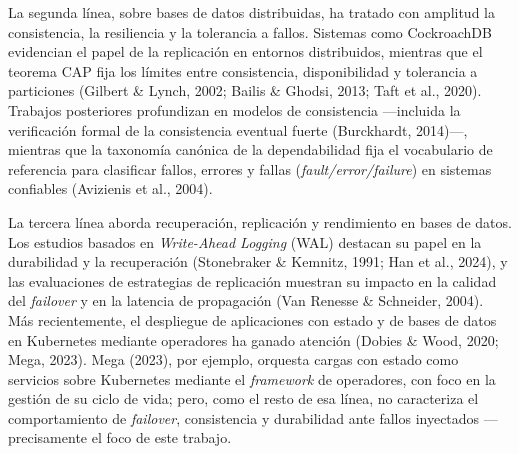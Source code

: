 \documentclass[12pt,twocolumn,letterpaper]{article}
\begin{document}
La segunda línea, sobre bases de datos distribuidas, ha tratado con amplitud la consistencia, la resiliencia y la tolerancia a fallos. Sistemas como CockroachDB evidencian el papel de la replicación en entornos distribuidos, mientras que el teorema CAP fija los límites entre consistencia, disponibilidad y tolerancia a particiones (Gilbert \& Lynch, 2002; Bailis \& Ghodsi, 2013; Taft et al., 2020). Trabajos posteriores profundizan en modelos de consistencia —incluida la verificación formal de la consistencia eventual fuerte (Burckhardt, 2014)—, mientras que la taxonomía canónica de la dependabilidad fija el vocabulario de referencia para clasificar fallos, errores y fallas (\textit{fault/error/failure}) en sistemas confiables (Avizienis et al., 2004).

La tercera línea aborda recuperación, replicación y rendimiento en bases de datos. Los estudios basados en \textit{Write-Ahead Logging} (WAL) destacan su papel en la durabilidad y la recuperación (Stonebraker \& Kemnitz, 1991; Han et al., 2024), y las evaluaciones de estrategias de replicación muestran su impacto en la calidad del \textit{failover} y en la latencia de propagación (Van Renesse \& Schneider, 2004). Más recientemente, el despliegue de aplicaciones con estado y de bases de datos en Kubernetes mediante operadores ha ganado atención (Dobies \& Wood, 2020; Mega, 2023). Mega (2023), por ejemplo, orquesta cargas con estado como servicios sobre Kubernetes mediante el \textit{framework} de operadores, con foco en la gestión de su ciclo de vida; pero, como el resto de esa línea, no caracteriza el comportamiento de \textit{failover}, consistencia y durabilidad ante fallos inyectados —precisamente el foco de este trabajo.
\end{document}

